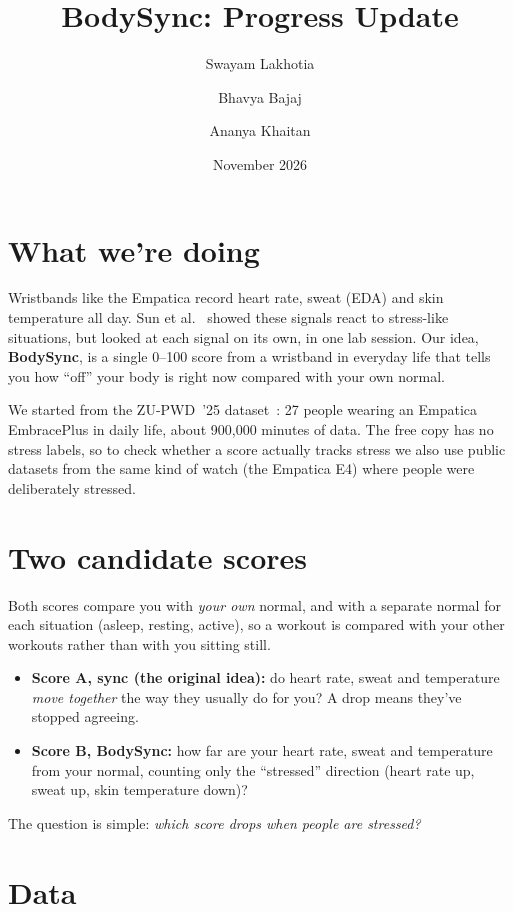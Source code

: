 \documentclass{article}
\title{BodySync: Progress Update}
\author{Swayam Lakhotia \and Bhavya Bajaj \and Ananya Khaitan}
\date{November 2026}
\begin{document}
\maketitle

\section{What we're doing}

Wristbands like the Empatica record heart rate, sweat (EDA) and skin temperature all day. Sun et al.~\cite{sun2026trust} showed these signals react to stress-like situations, but looked at each signal on its own, in one lab session. Our idea, \textbf{BodySync}, is a single 0--100 score from a wristband in everyday life that tells you how ``off'' your body is right now compared with your own normal.

We started from the ZU-PWD~'25 dataset~\cite{zupwd}: 27 people wearing an Empatica EmbracePlus in daily life, about 900,000 minutes of data. The free copy has no stress labels, so to check whether a score actually tracks stress we also use public datasets from the same kind of watch (the Empatica E4) where people were deliberately stressed.

\section{Two candidate scores}

Both scores compare you with \emph{your own} normal, and with a separate normal for each situation (asleep, resting, active), so a workout is compared with your other workouts rather than with you sitting still.

\begin{itemize}
\item \textbf{Score A, sync (the original idea):} do heart rate, sweat and temperature \emph{move together} the way they usually do for you? A drop means they've stopped agreeing.
\item \textbf{Score B, BodySync:} how far are your heart rate, sweat and temperature from your normal, counting only the ``stressed'' direction (heart rate up, sweat up, skin temperature down)?
\end{itemize}

The question is simple: \emph{which score drops when people are stressed?}

\section{Data}
\end{document}
